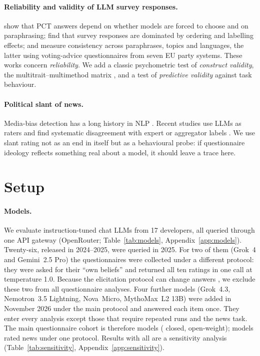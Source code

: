 \documentclass[11pt]{article}
\begin{document}
\paragraph{Reliability and validity of LLM survey responses.}
\citet{rottger-etal-2024-political} show that PCT answers depend on whether models are forced to choose and on paraphrasing; \citet{dominguez2024questioning} find that survey responses are dominated by ordering and labelling effects; \citet{moore-etal-2024-large} and \citet{ceron-etal-2024-beyond} measure consistency across paraphrases, topics and languages, the latter using voting-advice questionnaires from seven EU party systems. These works concern \emph{reliability}. We add a classic psychometric test of \emph{construct validity}, the multitrait--multimethod matrix \citep{campbell1959convergent}, and a test of \emph{predictive validity} against task behaviour.

\paragraph{Political slant of news.}
Media-bias detection has a long history in NLP \citep{kiesel-etal-2019-semeval,baly-etal-2020-detect,spinde2024media}. Recent studies use LLMs as raters and find systematic disagreement with expert or aggregator labels \citep{prama-islam-2025-evaluating,Rnnback2025}. We use slant rating not as an end in itself but as a behavioural probe: if questionnaire ideology reflects something real about a model, it should leave a trace here.

\section{Setup}
\label{sec:setup}

\paragraph{Models.}
We evaluate \nNModelsAll{} instruction-tuned chat LLMs from 17 developers, all queried through one API gateway (OpenRouter; Table~\ref{tab:models}, Appendix~\ref{app:models}). Twenty-six, released in 2024--2025, were queried in 2025. For two of them (Grok~4 and Gemini~2.5 Pro) the questionnaires were collected under a different protocol: they were asked for their ``own beliefs'' and returned all ten ratings in one call at temperature 1.0. Because the elicitation protocol can change answers \citep{rottger-etal-2024-political}, we exclude these two from all questionnaire analyses. Four further models (Grok~4.3, Nemotron~3.5 Lightning, Nova~Micro, MythoMax~L2 13B) were added in November 2026 under the main protocol and answered each item once. They enter every analysis except those that require repeated runs and the news task. The main questionnaire cohort is therefore \nNModels{} models (\nNClosed{} closed, \nNOpen{} open-weight); \nNModelsNews{} models rated news under one protocol. Results with all \nNModelsAll{} are a sensitivity analysis (Table~\ref{tab:sensitivity}, Appendix~\ref{app:sensitivity}).
\end{document}
